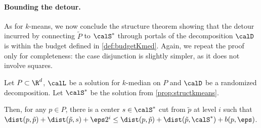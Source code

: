 \paragraph{Bounding the detour.}
As for $k$-means, we now conclude the structure theorem showing that the detour incurred by connecting $\tilde P$ to $\calS^*$ through portals of the decomposition $\calD$ is within the budget defined in \cref{def:budgetKmed}. Again, we repeat the proof only for completeness: the case disjunction is slightly simpler, as it does not involve squares.

\begin{lemma}
  \label{lem:detourkmedians}
Let $P \subset \R^d$, $\calL$ be a solution for $k$-median on $P$ and $\calD$ be a randomized decomposition. 
Let $\calS^*$ be the solution from \cref{prop:structkmeans}.

 Then, for any $p \in P$, there is a center $s \in \calS^*$ cut from $\tilde p$ at level $i$ such that $\dist(p, \tilde p) + \dist(\tilde p, s) + \eps 2^i \leq \dist(p, \tilde p) + \dist(\tilde p, \calS^*) + b(p, \eps)$.
 \end{lemma}
